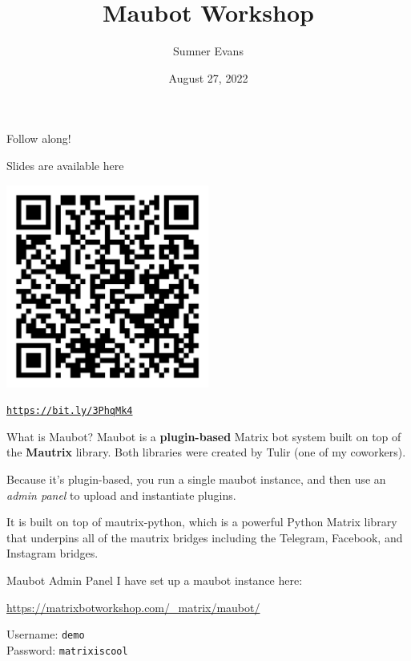 \documentclass{beeper}
\title{Maubot Workshop}
\author{Sumner Evans}
\institute{Beeper}
\date{August 27, 2022}
\begin{document}
\begin{frame}{Follow along!}
    \begin{center}
    Slides are available here
        \vspace{0.5cm}
    \end{center}

    \centerline{\includegraphics[width=0.5\textwidth]{images/slides-qrcode}}

    \begin{center}
        \href{https://bit.ly/3PhqMk4}{\texttt{https://bit.ly/3PhqMk4}}
    \end{center}
\end{frame}

\begin{frame}{What is Maubot?}
    Maubot is a \textbf{plugin-based} Matrix bot system built on top of the
    \textbf{Mautrix} library. Both libraries were created by Tulir (one of my
    coworkers).

    \pause
    Because it's plugin-based, you run a single maubot instance, and then use an
    \textit{admin panel} to upload and instantiate plugins.

    \pause
    It is built on top of mautrix-python, which is a powerful Python Matrix
    library that underpins all of the mautrix bridges including the Telegram,
    Facebook, and Instagram bridges.
\end{frame}

\begin{frame}{Maubot Admin Panel}
    I have set up a maubot instance here:

    \begin{center}
        \large
        \url{https://matrixbotworkshop.com/_matrix/maubot/}
    \end{center}

    Username: \texttt{demo} \\
    Password: \texttt{matrixiscool}
\end{frame}
\end{document}
